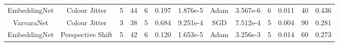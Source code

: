 \begin{table}[!t]
{\begin{tabular}{ccccccccccccc}
			EmbeddingNet                                                       & Colour Jitter                                                                    & 5                                                                 & 44                                                                                     & 6                                                                                             & 0.197            & 1.876e-5                                                          & Adam               & 3.567e-6                                                                             & 6                                                                                 & 0.011             & 40                                                                & 0.436                                                                             \\
			VarvaraNet                                                         & Colour Jitter                                                                    & 3                                                                 & 38                                                                                     & 5                                                                                             & 0.684            & 9.251e-4                                                          & SGD                & 7.512e-4                                                                             & 5                                                                                 & 0.004             & 90                                                                & 0.281                                                                             \\
			EmbeddingNet                                                       & Perspective Shift                                                                & 5                                                                 & 42                                                                                     & 6                                                                                             & 0.120            & 1.653e-5                                                          & Adam               & 3.256e-3                                                                             & 5                                                                                 & 0.014             & 60                                                                & 0.273                                                                             \\

\end{tabular}}
\end{table}
